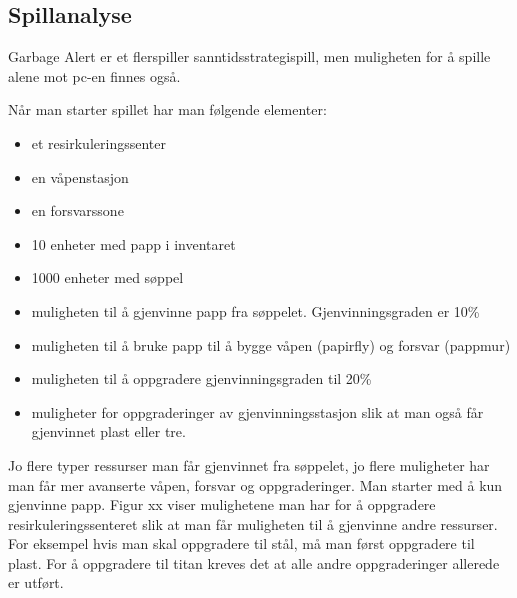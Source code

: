 

\subsection{Spillanalyse}

Garbage Alert er et flerspiller sanntidsstrategispill, men muligheten for å spille alene mot pc-en finnes også. 

Når man starter spillet har man følgende elementer:

\begin{itemize}
	\item et resirkuleringssenter
	\item en våpenstasjon
	\item en forsvarssone
	\item 10 enheter med papp i inventaret
	\item 1000 enheter med søppel
	\item muligheten til å gjenvinne papp fra søppelet. Gjenvinningsgraden er 10\%
	\item muligheten til å bruke papp til å bygge våpen (papirfly) og forsvar (pappmur)
	\item muligheten til å oppgradere gjenvinningsgraden til 20\%
	\item muligheter for oppgraderinger av gjenvinningsstasjon slik at man også får gjenvinnet plast eller tre.
\end{itemize}

Jo flere typer ressurser man får gjenvinnet fra søppelet, jo flere muligheter har man får mer avanserte våpen, forsvar og oppgraderinger. Man starter med å kun gjenvinne papp. Figur xx viser mulighetene man har for å oppgradere resirkuleringssenteret slik at man får muligheten til å gjenvinne andre ressurser. For eksempel hvis man skal oppgradere til stål, må man først oppgradere til plast. For å oppgradere til titan kreves det at alle andre oppgraderinger allerede er utført.

